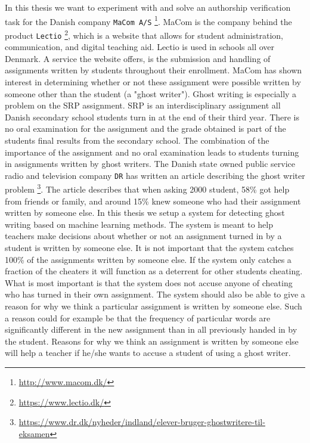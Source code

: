 
In this thesis we want to experiment with and solve an authorship
verification task for the Danish company \texttt{MaCom A/S}
\footnote{\url{http://www.macom.dk/}}. MaCom is the company behind the product
\texttt{Lectio} \footnote{\url{https://www.lectio.dk/}}, which is a website
that allows for student administration, communication, and digital teaching
aid. Lectio is used in schools all over Denmark. A service the website offers,
is the submission and handling of assignments written by students throughout
their enrollment. MaCom has shown interest in determining whether or not these
assignment were possible written by someone other than the student (a "ghost
writer"). Ghost writing is especially a problem on the \gls{SRP} assignment.
\gls{SRP} is an interdisciplinary assignment all Danish secondary school
students turn in at the end of their third year. There is no oral examination
for the assignment and the grade obtained is part of the students final results
from the secondary school. The combination of the importance of the assignment
and no oral examination leads to students turning in assignments written by
ghost writers. The Danish state owned public service radio and television
company \texttt{DR} has written an article describing the ghost writer problem
\footnote{\url{https://www.dr.dk/nyheder/indland/elever-bruger-ghostwritere-til-
eksamen}}. The article describes that when asking 2000 student, 58\% got help
from friends or family, and around 15\% knew someone who had their assignment
written by someone else. In this thesis we setup a system for detecting ghost
writing based on machine learning methods. The system is meant to help teachers
make decisions about whether or not an assignment turned in by a student is
written by someone else. It is not important that the system catches 100\% of
the assignments written by someone else. If the system only catches a fraction
of the cheaters it will function as a deterrent for other students cheating.
What is most important is that the system does not accuse anyone of cheating
who has turned in their own assignment. The system should also be able to give
a reason for why we think a particular assignment is written by someone else.
Such a reason could for example be that the frequency of particular words are
significantly different in the new assignment than in all previously handed in
by the student. Reasons for why we think an assignment is written by someone
else will help a teacher if he/she wants to accuse a student of using a ghost
writer.

